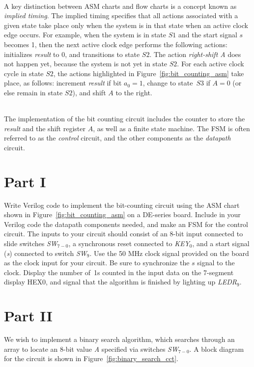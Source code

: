 \documentclass[epsfig,10pt,fullpage]{article}
\begin{document}
~\\
A key distinction between ASM charts and flow charts is a concept known as {\it implied timing}. 
The implied timing specifies that all actions associated with a given state take place
only when the system is in that state when an active clock edge occurs. For example, when
the system is in state $S1$ and the start signal $s$ becomes 1, then the next active clock
edge performs the following actions: initializes {\it result} to 0, and transitions to 
state $S2$. The action {\it right-shift A} does not happen yet, because the system is not yet 
in state $S2$. For each active clock cycle in state $S2$, the actions highlighted in 
Figure~\ref{fig:bit_counting_asm} take place, as follows: increment {\it result} if bit
$a_0 = 1$, change to state~$S3$ if $A = 0$ (or else remain in state $S2$), and shift $A$ to
the right. 

~\\
The implementation of the bit counting circuit includes the counter to store the {\it result} and
the shift register $A$, as well as a finite state machine.  The FSM is often referred to as 
the {\it control} circuit, and the other components as the {\it datapath} circuit. 

\section*{Part I}
Write Verilog code to implement the bit-counting circuit using the ASM chart shown in
Figure~\ref{fig:bit_counting_asm} on a DE-series board. Include in your Verilog code the
datapath components needed, and make an FSM for the control circuit. The inputs to your 
circuit should consist of an 8-bit input connected to slide switches {\it SW}$_{7-0}$, a
synchronous reset connected to {\it KEY}$_0$, and a start signal
({\it s}) connected to switch {\it SW}$_9$. Use the 50 MHz clock signal provided on the
board as the clock input for your circuit. Be sure to synchronize the $s$ signal to the 
clock. Display the number of~1s counted in the input data on the 7-segment display HEX0, and 
signal that the algorithm is finished by lighting up {\it LEDR}$_9$.

\section*{Part II}
We wish to implement a binary search algorithm, which searches through an array to locate 
an 8-bit value {\it A} specified via switches {\it SW}$_{7-0}$. A block diagram for the 
circuit is shown in Figure~\ref{fig:binary_search_cct}.
\end{document}

